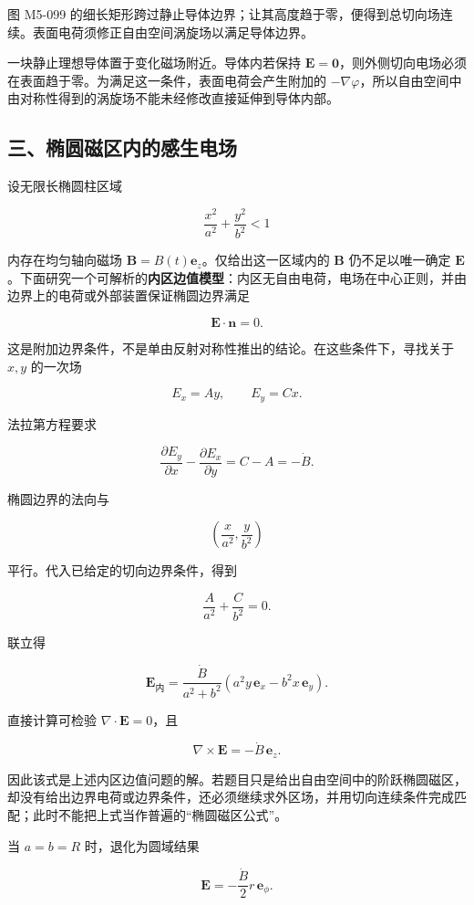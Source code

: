 图 M5-099
的细长矩形跨过静止导体边界；让其高度趋于零，便得到总切向场连续。表面电荷须修正自由空间涡旋场以满足导体边界。

一块静止理想导体置于变化磁场附近。导体内若保持
\(\mathbf E=\mathbf0\)，则外侧切向电场必须在表面趋于零。为满足这一条件，表面电荷会产生附加的
\(-\nabla\varphi\)，所以自由空间中由对称性得到的涡旋场不能未经修改直接延伸到导体内部。

\subsection{三、椭圆磁区内的感生电场}\label{m5:ux4e09ux692dux5706ux78c1ux533aux5185ux7684ux611fux751fux7535ux573a}

设无限长椭圆柱区域

\[
\frac{x^2}{a^2}+\frac{y^2}{b^2}<1
\]

内存在均匀轴向磁场 \(\mathbf B=B(t)\mathbf e_z\)。仅给出这一区域内的
\(\mathbf B\) 仍不足以唯一确定
\(\mathbf E\)。下面研究一个可解析的\textbf{内区边值模型}：内区无自由电荷，电场在中心正则，并由边界上的电荷或外部装置保证椭圆边界满足

\[
\mathbf E\cdot\mathbf n=0.
\]

这是附加边界条件，不是单由反射对称性推出的结论。在这些条件下，寻找关于
\(x,y\) 的一次场

\[
E_x=Ay,\qquad E_y=Cx.
\]

法拉第方程要求

\[
\frac{\partial E_y}{\partial x}-\frac{\partial E_x}{\partial y}
=C-A=-\dot B.
\]

椭圆边界的法向与

\[
\left(\frac{x}{a^2},\frac{y}{b^2}\right)
\]

平行。代入已给定的切向边界条件，得到

\[
\frac{A}{a^2}+\frac{C}{b^2}=0.
\]

联立得

\[
\boxed{
\mathbf E_{\text{内}}
=\frac{\dot B}{a^2+b^2}
\left(a^2y\,\mathbf e_x-b^2x\,\mathbf e_y\right)}.
\]

直接计算可检验 \(\nabla\cdot\mathbf E=0\)，且

\[
\nabla\times\mathbf E=-\dot B\,\mathbf e_z.
\]

因此该式是上述内区边值问题的解。若题目只是给出自由空间中的阶跃椭圆磁区，却没有给出边界电荷或边界条件，还必须继续求外区场，并用切向连续条件完成匹配；此时不能把上式当作普遍的``椭圆磁区公式''。

当 \(a=b=R\) 时，退化为圆域结果

\[
\mathbf E=-\frac{\dot B}{2}r\,\mathbf e_{\phi}.
\]


